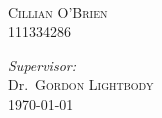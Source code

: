 \begin{titlepage}
\begin{minipage}{0.6\textwidth}
\begin{flushleft}
			
			\vspace{.5cm}
			
			
			
			
			
			
		\end{flushleft}
	\end{minipage}
	~
	\begin{minipage}{0.3\textwidth}
		\begin{flushleft}  \large
			\textsc{Cillian O'Brien} \\%
			111334286\\
			
			
			\vspace{.5cm}
			
			
			
			
			
		\end{flushleft}
	\end{minipage}
	
	
	\vfill %
	
	
	
	\begin{center}

		\large
		\emph{Supervisor:} \\
		Dr.~\textsc{Gordon} \textsc{Lightbody}\\
		{\large \today}\\ %
		
	\end{center}
	
	
	\clearpage{\pagestyle{empty}\cleardoublepage}
\end{titlepage}